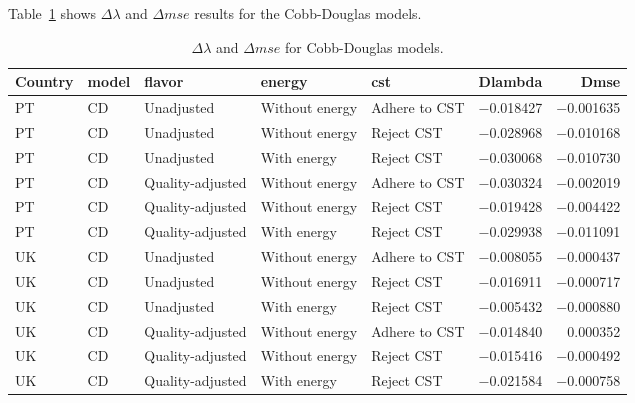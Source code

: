 \documentclass[preprint,authoryear,12pt]{elsarticle}\usepackage[]{graphicx}\usepackage[]{color}
\begin{document}
%

Table~\ref{tab:DSRmse_CD} shows $\Delta \lambda$ and $\Delta mse$ results for the Cobb-Douglas models.
%
\begin{table}[ht]
\centering
\caption{$\Delta \lambda$ and $\Delta mse$ for Cobb-Douglas models.} 
\label{tab:DSRmse_CD}
{\tiny
\begin{tabular}{lllllrr}
  \hline
Country & model & flavor & energy & cst & Dlambda & Dmse \\ 
  \hline
PT & CD & Unadjusted & Without energy & Adhere to CST & $-$0.018427 & $-$0.001635 \\ 
  PT & CD & Unadjusted & Without energy & Reject CST & $-$0.028968 & $-$0.010168 \\ 
  PT & CD & Unadjusted & With energy & Reject CST & $-$0.030068 & $-$0.010730 \\ 
  PT & CD & Quality-adjusted & Without energy & Adhere to CST & $-$0.030324 & $-$0.002019 \\ 
  PT & CD & Quality-adjusted & Without energy & Reject CST & $-$0.019428 & $-$0.004422 \\ 
  PT & CD & Quality-adjusted & With energy & Reject CST & $-$0.029938 & $-$0.011091 \\ 
  UK & CD & Unadjusted & Without energy & Adhere to CST & $-$0.008055 & $-$0.000437 \\ 
  UK & CD & Unadjusted & Without energy & Reject CST & $-$0.016911 & $-$0.000717 \\ 
  UK & CD & Unadjusted & With energy & Reject CST & $-$0.005432 & $-$0.000880 \\ 
  UK & CD & Quality-adjusted & Without energy & Adhere to CST & $-$0.014840 & 0.000352 \\ 
  UK & CD & Quality-adjusted & Without energy & Reject CST & $-$0.015416 & $-$0.000492 \\ 
  UK & CD & Quality-adjusted & With energy & Reject CST & $-$0.021584 & $-$0.000758 \\ 
   \hline
\end{tabular}
}
\end{table}

% 
\end{document}
